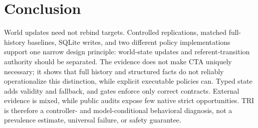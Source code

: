 \documentclass[letterpaper]{article}
\begin{document}
\section{Conclusion}

World updates need not rebind targets. Controlled replications, matched full-history baselines,
SQLite writes, and two different policy implementations support one narrow design principle:
world-state updates and referent-transition authority should be separated. The evidence does not
make CTA uniquely necessary; it shows that full history and structured facts do not reliably
operationalize this distinction, while explicit executable policies can. Typed state adds validity
and fallback, and gates enforce only correct contracts. External evidence is mixed, while public
audits expose few native strict opportunities. TRI is therefore a controller- and model-conditional
behavioral diagnosis, not a prevalence estimate, universal failure, or safety guarantee.

\clearpage
{\small

}
\end{document}
